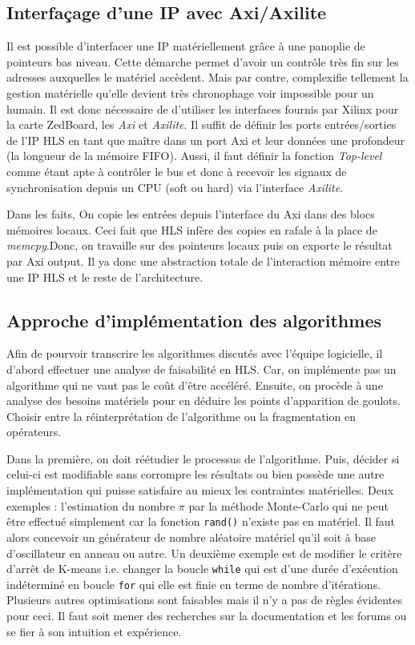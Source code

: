 \documentclass[12pt,a4paper]{article}
\begin{document}
\subsection{Interfaçage d'une IP avec Axi/Axilite}
Il est possible d'interfacer une IP matériellement grâce à une panoplie de pointeurs bas niveau. Cette démarche permet d'avoir un contrôle très fin sur les adresses auxquelles le matériel accèdent. Mais par contre, complexifie tellement la gestion matérielle qu'elle devient très chronophage voir impossible pour un humain. Il est donc nécessaire de d'utiliser les interfaces fournis par Xilinx pour la carte ZedBoard, les \textit{Axi} et \textit{Axilite}. Il suffit de définir les ports entrées/sorties de l'IP HLS en tant que maître dans un port Axi et leur données une profondeur (la longueur de la mémoire FIFO). Aussi, il faut définir la fonction \textit{Top-level} comme étant apte à contrôler le bus et donc à recevoir les signaux de synchronisation depuis un CPU (soft ou hard) via l'interface \textit{Axilite}.

Dans les faits, On copie les entrées depuis l'interface du Axi dans des blocs mémoires locaux. Ceci fait que HLS infère des copies en rafale à la place de \textit{memcpy}.Donc, on travaille sur des pointeurs locaux puis on exporte le résultat par Axi output. Il ya donc une abstraction totale de l'interaction mémoire entre une IP HLS et le reste de l'architecture.

\subsection{Approche d'implémentation des algorithmes}
Afin de pourvoir transcrire les algorithmes discutés avec l'équipe logicielle, il d'abord effectuer une analyse de faisabilité en HLS. Car, on implémente pas un algorithme qui ne vaut pas le coût d'être accéléré. Ensuite, on procède à une analyse des besoins matériels pour en déduire les points d'apparition de goulots. Choisir entre la réinterprétation de l'algorithme ou la fragmentation en opérateurs.

Dans la première, on doit réétudier le processus de l'algorithme. Puis, décider si celui-ci est modifiable sans corrompre les résultats ou bien possède une autre implémentation qui puisse satisfaire au mieux les contraintes matérielles. Deux exemples : l'estimation du nombre $\pi$ par la méthode Monte-Carlo qui ne peut être effectué simplement car la fonction \texttt{rand()} n'existe pas en matériel. Il faut alors concevoir un générateur de nombre aléatoire matériel qu'il soit à base d'oscillateur en anneau ou autre. Un deuxième exemple est de modifier le critère d'arrêt de K-means i.e. changer la boucle \texttt{while} qui est d'une durée d'exécution indéterminé en boucle \texttt{for} qui elle est finie en terme de nombre d'itérations. Plusieurs autres optimisations sont faisables mais il n'y a pas de règles évidentes pour ceci. Il faut soit mener des recherches sur la documentation et les forums ou se fier à son intuition et expérience.
\end{document}
